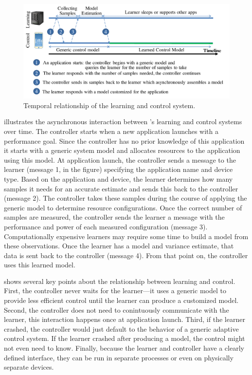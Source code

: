 \begin{figure}
  \includegraphics[width=\columnwidth]{figures/Timeline.pdf}
  \caption{Temporal relationship of the learning and control system.}
  \label{fig:timeline}
\end{figure}

 illustrates the asynchronous interaction between
\SYSTEM{}'s learning and control systems over time. The controller
starts when a new application launches with a performance goal.  Since
the controller has no prior knowledge of this application it starts
with a generic system model and allocates resources to the application
using this model.  At application launch, the controller sends a
message to the learner (message 1, in the figure) specifying the
application name and device type.  Based on the application and
device, the learner determines how many samples it needs for an
accurate estimate and sends this back to the controller (message 2).
The controller takes these samples during the course of applying the
generic model to determine resource configurations.  Once the correct
number of samples are measured, the controller sends the learner a
message with the performance and power of each measured configuration
(message 3).  Computationally expensive learners may require some time
to build a model from these observations.  Once the learner has a
model and variance estimate, that data is sent back to the controller
(message 4). From that point on, the controller uses this learned model.  

 shows several key points about the relationship
between learning and control.  First, the controller never waits for
the learner---it uses a generic model to provide less efficient
control until the learner can produce a customized model. Second, the
controller does not need to conintuously communicate with the learner,
this interaction happens once at application launch.  Third, if the
learner crashed, the controller would just default to the behavior of
a generic adaptive control system.  If the learner crashed after
producing a model, the control might not even need to know.  Finally,
because the learner and controller have a clearly defined interface,
they can be run in separate processes or even on physically separate
devices.

